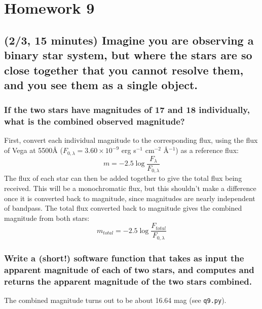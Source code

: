 \documentclass[12pt]{article}
\begin{document}
\section{Homework 9}
\subsection*{(2/3, 15 minutes)
Imagine you are observing a binary star system,
but where the stars are so close together that you cannot
resolve them, and you see them as a single object.}

\subsubsection{If the two stars have magnitudes of 17 and 18
individually, what is the combined observed magnitude?}
First, convert each individual magnitude to the corresponding flux,
using the flux of Vega at 5500\AA{}
($F_{0,\lambda} = 3.60\times10^{-9}$ erg s$^{-1}$ cm$^{-2}$
\AA{}$^{-1}$)
as a reference flux:
    $$ m = -2.5\log\frac{F_{\lambda}}{F_{0,\lambda}}  $$
The flux of each star can then be added together to give the total flux
being received. This will be a monochromatic flux, but this shouldn't
make a difference once it is converted back to magnitude,
since magnitudes are nearly independent of bandpass.
The total flux converted back to magnitude gives the combined
magnitude from both stars:
    $$ m_{total} = -2.5\log\frac{F_{total}}{F_{0,\lambda}} $$

\subsubsection{Write a (short!) software function that takes
as input the apparent magnitude of each of two stars,
and computes and returns the apparent magnitude of the
two stars combined.}
The combined magnitude turns out to be about 16.64 mag
(see \texttt{q9.py}).
\end{document}
